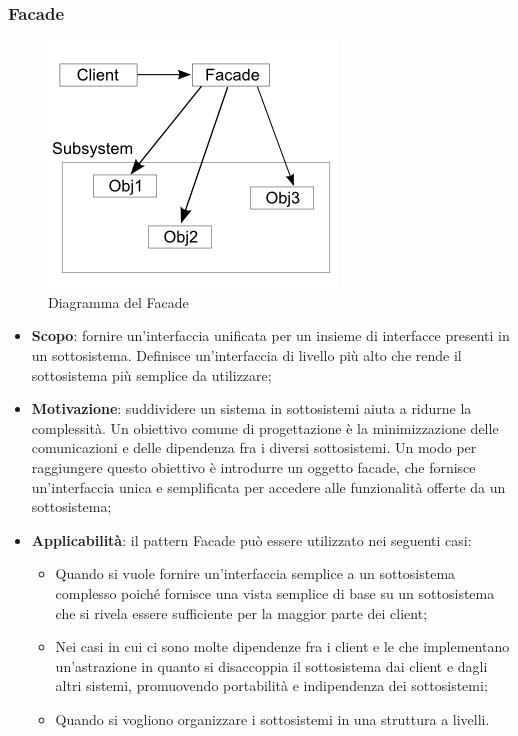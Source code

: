 		\subsubsection{Facade}
		\begin{figure}[H]
		\centering
		\includegraphics[width=0.4\linewidth]{GraficiAppendici/facade.png}
		\caption{Diagramma del  Facade}
	\end{figure}
		\begin{itemize}
		\item \textbf{Scopo}: fornire un’interfaccia unificata per un insieme di interfacce presenti in un
sottosistema. Definisce un’interfaccia di livello più alto che rende il sottosistema più semplice da utilizzare;
		\item \textbf{Motivazione}: suddividere un sistema in sottosistemi aiuta a ridurne la complessità.
Un obiettivo comune di progettazione è la minimizzazione delle comunicazioni e delle dipendenza fra i diversi sottosistemi. Un modo per raggiungere questo obiettivo è introdurre un oggetto facade, che fornisce un’interfaccia unica e semplificata per accedere alle funzionalità offerte da un sottosistema;
		\item \textbf{Applicabilità}: il pattern Facade può essere utilizzato nei seguenti casi:
		\begin{itemize}
		\item Quando si vuole fornire un’interfaccia semplice a un sottosistema complesso poiché fornisce una vista semplice di base su un sottosistema che si rivela essere sufficiente per la maggior parte dei client;
		\item Nei casi in cui ci sono molte dipendenze fra i client e le  che implementano un’astrazione in quanto si disaccoppia il sottosistema dai client e dagli altri sistemi, promuovendo portabilità e indipendenza dei sottosistemi;
		\item Quando si vogliono organizzare i sottosistemi in una struttura a livelli.
		\end{itemize}

		\end{itemize}

